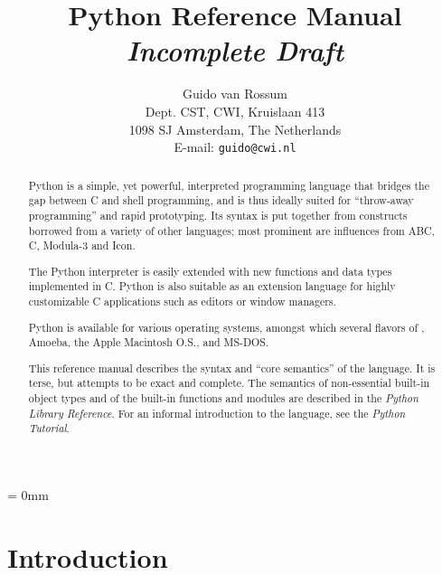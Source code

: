 

\title{\bf
	Python Reference Manual \\
	{\em Incomplete Draft}
}
	
\author{
	Guido van Rossum \\
	Dept. CST, CWI, Kruislaan 413 \\
	1098 SJ Amsterdam, The Netherlands \\
	E-mail: {\tt guido@cwi.nl}
}




\maketitle

\begin{abstract}

\noindent
Python is a simple, yet powerful, interpreted programming language
that bridges the gap between C and shell programming, and is thus
ideally suited for ``throw-away programming'' and rapid prototyping.
Its syntax is put together from constructs borrowed from a variety of
other languages; most prominent are influences from ABC, C, Modula-3
and Icon.

The Python interpreter is easily extended with new functions and data
types implemented in C.  Python is also suitable as an extension
language for highly customizable C applications such as editors or
window managers.

Python is available for various operating systems, amongst which
several flavors of {\UNIX}, Amoeba, the Apple Macintosh O.S.,
and MS-DOS.

This reference manual describes the syntax and ``core semantics'' of
the language.  It is terse, but attempts to be exact and complete.
The semantics of non-essential built-in object types and of the
built-in functions and modules are described in the {\em Python
Library Reference}.  For an informal introduction to the language, see
the {\em Python Tutorial}.

\end{abstract}

\pagebreak

{
\parskip = 0mm
\tableofcontents
}

\pagebreak


\chapter{Introduction}

